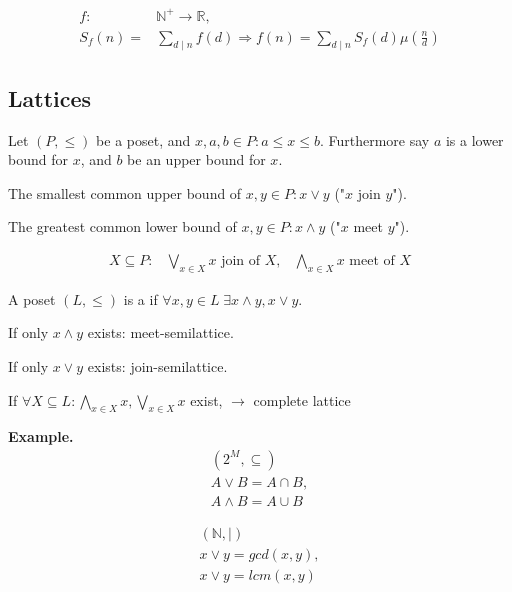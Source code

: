 
\begin{align*}
  f: &\mathbb{N}^{+} \rightarrow \mathbb{R}, \\
  S_f(n) =& \sum_{d\mid n} f(d) \Rightarrow f(n) = \sum_{d\mid n} S_f(d)\mu\left(\frac{n}{d}\right)
\end{align*}

\subsection{Lattices}
\begin{definition}
Let $(P, \leq)$ be a poset, and $x,a,b \in P: a\leq x \leq b$. Furthermore say $a$ is a lower bound for $x$, and $b$ be an upper bound for $x$.

The smallest common upper bound of $x,y \in P: x \vee y$ ("$x$ join $y$").

The greatest common lower bound of $x,y \in P: x \wedge y$ ("$x$ meet $y$").

\begin{align*}
    X \subseteq P: &\bigvee_{x \in X} x \text{ join of } X, 
        & \bigwedge_{x \in X} x \text{ meet of } X 
\end{align*}
\end{definition}

\begin{definition}
A poset $(L, \leq)$ is a  if $\forall x,y \in L \; \exists x \wedge y, x \vee y$.

If only $x \wedge y$ exists: meet-semilattice. 

If only $x \vee y$ exists: join-semilattice. 


If $\forall X \subseteq L : \bigwedge_{x \in X} x, \bigvee_{x \in X} x$ exist, $\rightarrow$ complete lattice
\end{definition}

\textbf{Example.}
\begin{align*}
  (2^M, \subseteq) \\
  A\vee B = A \cap B, \\
  A\wedge B = A \cup B
\end{align*}

\begin{align*}
  (\mathbb{N}, \mid) \\
  x \vee y = gcd(x,y), \\
  x \vee y = lcm(x,y)
\end{align*}

